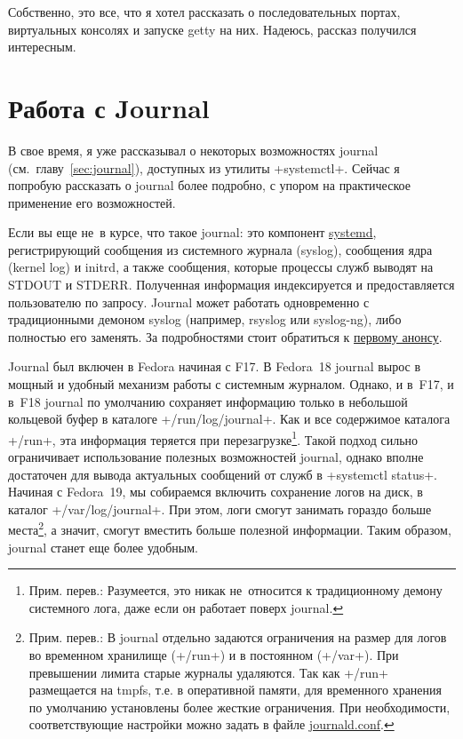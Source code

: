 \documentclass[10pt,oneside,a4paper]{article}
\begin{document}
Собственно, это все, что я хотел рассказать о последовательных портах,
виртуальных консолях и запуске getty на них. Надеюсь, рассказ получился
интересным.

\section{Работа с Journal}

В свое время, я уже рассказывал о некоторых возможностях journal
(см.~главу~\ref{sec:journal}), доступных из утилиты +systemctl+. Сейчас я
попробую рассказать о journal более подробно, с упором на практическое
применение его возможностей.

Если вы еще не~в курсе, что такое journal: это компонент
\href{http://www.freedesktop.org/wiki/Software/systemd}{systemd}, регистрирующий
сообщения из системного журнала (syslog), сообщения ядра (kernel log) и initrd,
а также сообщения, которые процессы служб выводят на STDOUT и STDERR. Полученная
информация индексируется и предоставляется пользователю по запросу. Journal
может работать одновременно с традиционными демоном syslog (например, rsyslog
или syslog-ng), либо полностью его заменять. За подробностями стоит 
обратиться к \href{http://0pointer.de/blog/projects/the-journal.html}{первому
анонсу}.

Journal был включен в Fedora начиная с F17. В Fedora~18 journal вырос в мощный и
удобный механизм работы с системным журналом. Однако, и в~F17, и в~F18 journal
по умолчанию сохраняет информацию только в небольшой кольцевой буфер в каталоге
+/run/log/journal+. Как и все содержимое каталога +/run+, эта информация
теряется при перезагрузке\footnote{Прим. перев.: Разумеется, это никак
не~относится к традиционному демону системного лога, даже если он работает
поверх journal.}. Такой подход сильно ограничивает использование
полезных возможностей journal, однако вполне достаточен для вывода актуальных
сообщений от служб в +systemctl status+. Начиная с Fedora~19, мы собираемся
включить сохранение логов на диск, в каталог +/var/log/journal+. При этом,
логи смогут занимать гораздо больше места\footnote{Прим. перев.: В journal
отдельно задаются ограничения на размер для логов во временном хранилище
(+/run+) и в постоянном (+/var+). При превышении лимита старые журналы
удаляются. Так как +/run+ размещается на tmpfs, т.е. в
оперативной памяти, для временного хранения по умолчанию установлены более
жесткие ограничения. При необходимости, соответствующие настройки можно задать
в файле
\href{http://www.freedesktop.org/software/systemd/man/journald.conf.html}{journald.conf}.},
а значит, смогут вместить больше полезной информации. Таким образом, journal
станет еще более удобным.
\end{document}
